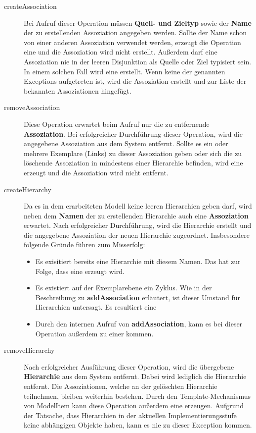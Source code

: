 \begin{description}
\item[createAssociation] Bei Aufruf dieser Operation müssen \textbf{Quell- und Zieltyp} sowie der \textbf{Name} der zu erstellenden Assoziation 
angegeben werden.
Sollte der Name schon von einer anderen Assoziation verwendet werden, erzeugt die Operation eine  und die Assoziation wird nicht
erstellt. Außerdem darf eine Assoziation nie in der leeren Disjunktion als Quelle oder Ziel typisiert sein. In einem solchen Fall
wird eine  erstellt.
Wenn keine der genannten Exceptions aufgetreten ist, wird die Assoziation erstellt und zur Liste der bekannten Assoziationen hingefügt. 
\item[removeAssociation] Diese Operation erwartet beim Aufruf nur die zu entfernende \textbf{Assoziation}. 
Bei erfolgreicher Durchführung dieser Operation, wird die
angegebene Assoziation aus dem System entfernt.
Sollte es ein oder mehrere Exemplare (Links) zu dieser Assoziation geben oder sich die zu löschende Assoziation in mindestens einer Hierarchie befinden, wird eine  erzeugt und die Assoziation wird nicht entfernt. 
\item[createHierarchy] Da es in dem erarbeiteten Modell keine leeren Hierarchien geben darf, wird neben dem \textbf{Namen} der zu erstellenden Hierarchie auch eine 
\textbf{Assoziation} erwartet. Nach erfolgreicher Durchführung, wird die Hierarchie erstellt und die angegebene Assoziation der neuen Hierarchie zugeordnet.
Insbesondere folgende Gründe führen zum Misserfolg:
\begin{itemize}
\item Es exisitiert bereits eine Hierarchie mit diesem Namen. Das hat zur Folge, dass eine  erzeugt wird.
\item Es existiert auf der Exemplarebene ein Zyklus. Wie in der Beschreibung zu \textbf{addAssociation} erläutert, ist dieser Umstand für Hierarchien untersagt.
 Es resultiert eine 
 \item Durch den internen Aufruf von \textbf{addAssociation}, kann es bei dieser Operation außerdem zu einer  kommen.
\end{itemize}
\item[removeHierarchy] Nach erfolgreicher Ausführung dieser Operation, wird die übergebene \textbf{Hierarchie} aus dem System entfernt. 
Dabei wird lediglich die Hierarchie entfernt. Die Assoziationen, welche an der gelöschten Hierarchie teilnehmen, bleiben weiterhin bestehen. Durch den Template-Mechanismus von ModelItem kann diese Operation außerdem eine  erzeugen. Aufgrund der Tatsache, dass Hierarchien in der aktuellen Implementierungsstufe keine abhängigen Objekte haben, kann es nie zu dieser Exception kommen.

\end{description}
